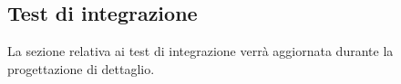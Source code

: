 \subsection{Test di integrazione}

\par La sezione relativa ai test di integrazione verrà aggiornata durante la progettazione di dettaglio.